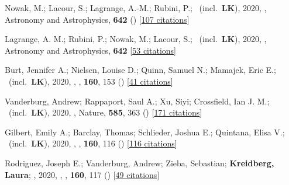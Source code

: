 \item[{\color{numcolor}\scriptsize43}] Nowak, M.; Lacour, S.; Lagrange, A.-M.; Rubini, P.; \etal\ (incl.\ \textbf{LK}), 2020, , Astronomy and Astrophysics, \textbf{642} () [\href{https://ui.adsabs.harvard.edu/abs/2020A&A...642L...2N}{107 citations}]

\item[{\color{numcolor}\scriptsize42}] Lagrange, A. M.; Rubini, P.; Nowak, M.; Lacour, S.; \etal\ (incl.\ \textbf{LK}), 2020, , Astronomy and Astrophysics, \textbf{642} [\href{https://ui.adsabs.harvard.edu/abs/2020A&A...642A..18L}{53 citations}]

\item[{\color{numcolor}\scriptsize41}] Burt, Jennifer A.; Nielsen, Louise D.; Quinn, Samuel N.; Mamajek, Eric E.; \etal\ (incl.\ \textbf{LK}), 2020, , \aj, \textbf{160}, 153 () [\href{https://ui.adsabs.harvard.edu/abs/2020AJ....160..153B}{41 citations}]

\item[{\color{numcolor}\scriptsize40}] Vanderburg, Andrew; Rappaport, Saul A.; Xu, Siyi; Crossfield, Ian J. M.; \etal\ (incl.\ \textbf{LK}), 2020, , Nature, \textbf{585}, 363 () [\href{https://ui.adsabs.harvard.edu/abs/2020Natur.585..363V}{171 citations}]

\item[{\color{numcolor}\scriptsize39}] Gilbert, Emily A.; Barclay, Thomas; Schlieder, Joshua E.; Quintana, Elisa V.; \etal\ (incl.\ \textbf{LK}), 2020, , \aj, \textbf{160}, 116 () [\href{https://ui.adsabs.harvard.edu/abs/2020AJ....160..116G}{116 citations}]

\item[{\color{numcolor}\scriptsize38}] Rodriguez, Joseph E.; Vanderburg, Andrew; Zieba, Sebastian; \textbf{Kreidberg, Laura}; \etal, 2020, , \aj, \textbf{160}, 117 () [\href{https://ui.adsabs.harvard.edu/abs/2020AJ....160..117R}{49 citations}]

